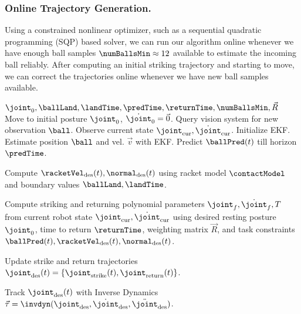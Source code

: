 
\subsubsection*{\textbf{Online Trajectory Generation}.} Using a constrained nonlinear optimizer, such as a sequential quadratic programming (SQP) based solver, we can run our algorithm online whenever we have enough ball samples $\numBallsMin \approx 12$ available to estimate the incoming ball reliably. After computing an initial striking trajectory and starting to move, we can correct the trajectories online whenever we have new ball samples available. 
%
\begin{algorithm}[t]
\begin{mdframed}
\small\sf%
\caption{$\Alg$ ($\alg$)}
\label{alg1}
\begin{minipage}{0.95\linewidth}
\begin{algorithmic}[1]
   \Require $\joint_0, \ballLand, \landTime, \predTime, \returnTime, \numBallsMin, \vec{R}$ %
   \State Move to initial posture $\joint_0$, $\dot{\joint}_0 = \vec{0}$.
   \Loop
	   \State Query vision system for new observation $\ball$.
   	   \State Observe current state $\joint_{\mathrm{cur}}, \dot{\joint}_{\mathrm{cur}}$.
	       \State Initialize EKF.
       \EndIf
	       \State Estimate position $\ball$ and vel. $\vec{v}$ with EKF.
		   \State Predict $\ballPred(t)$ till horizon $\predTime$.
		   \State \parbox[t]{\dimexpr\linewidth-\algorithmicindent}{Compute $\racketVel_{\mathrm{des}}(t), 			  \normal_{\mathrm{des}}(t)$ using racket 
			      model $\contactModel$ and boundary values $\ballLand, \landTime$.}
	   	   \State \parbox[t]{\dimexpr\linewidth-\algorithmicindent}{Compute striking and returning polynomial parameters $\joint_f, \dot{\joint}_f, T$ from current robot state $\joint_{\mathrm{cur}}, \dot{\joint}_{\mathrm{cur}}$ using desired resting posture $\joint_0$, time to return $\returnTime$, weighting matrix $\vec{R}$, and task constraints $\ballPred(t),\racketVel_{\mathrm{des}}(t), \normal_{\mathrm{des}}(t)$.}
		   \State \parbox[t]{\dimexpr\linewidth-\algorithmicindent}{Update strike and return trajectories $\joint_{\mathrm{des}}(t) = \{\joint_{\mathrm{strike}}(t), \joint_{\mathrm{return}}(t)\}$.}
	   \EndIf
	   \State \parbox[t]{\dimexpr\linewidth-\algorithmicindent}{Track $\joint_{\mathrm{des}}(t)$ with Inverse Dynamics $\vec{\tau} = \invdyn(\joint_{\mathrm{des}},\dot{\joint}_{\mathrm{des}},\ddot{\joint}_{\mathrm{des}})$.} %
   \EndLoop
\end{algorithmic}
\end{minipage}
\end{mdframed}
\end{algorithm}


